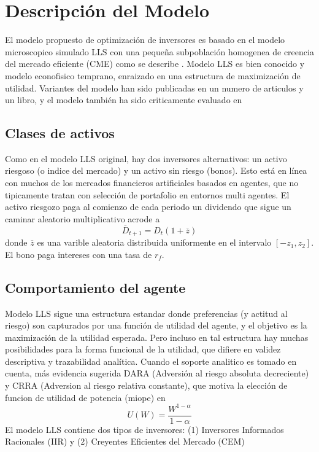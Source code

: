 \documentclass[12pt,a4paper]{article}
\begin{document}
\section*{Descripción del Modelo}
El modelo propuesto de optimización de inversores es basado en el modelo microscopico simulado LLS \citep{Levy2000} con una pequeña subpoblación homogenea de creencia del mercado eficiente (CME) como se describe \citep{levy2000}. Modelo LLS es bien conocido y modelo econofisico temprano, enraizado en una estructura de maximización de utilidad. Variantes del modelo han sido publicadas en un numero de articulos y un libro, y el modelo también ha sido criticamente evaluado en \citep{Zschischang2001}
\subsection*{Clases de activos}
Como en el modelo LLS original, hay dos inversores 
alternativos: un activo riesgoso (o indice del 
mercado) y un activo sin riesgo (bonos). Esto está 
en línea con muchos de los mercados financieros 
artificiales basados en agentes, que no
tipicamente tratan con selección de portafolio en entornos multi agentes. El activo riesgozo paga al comienzo de cada periodo un dividendo que sigue un caminar aleatorio multiplicativo acrode a 
\begin{equation}
\overline{D}_{t+1}= D_{t}(1+\overline{z})\label{6.1}
\end{equation}
donde $\overline{z}$ es una varible aleatoria distribuida uniformente en el intervalo $[-z_1,z_2]$. El bono paga intereses con una tasa de $r_f$.
\subsection*{Comportamiento del agente}
Modelo LLS sigue una estructura estandar donde preferencias (y actitud al riesgo) son capturados por una función de utilidad del agente, y el objetivo es la maximización de la utilidad esperada. Pero incluso en tal estructura hay muchas posibilidades para la forma funcional de la utilidad, que difiere en validez descriptiva y trazabilidad analítica. Cuando el soporte analitico es tomado en cuenta, más evidencia sugerida DARA (Adversión al riesgo absoluta decreciente) y CRRA (Adversion al riesgo relativa constante), que motiva la elección de funcion de utilidad de potencia (miope) en \citep{levy2000}
\begin{equation}
U(W)=\frac{W^{1-\alpha}}{1-\alpha} \label{6.2}
\end{equation}  
El modelo LLS contiene dos tipos de inversores: (1) Inversores Informados Racionales (IIR) y (2) Creyentes Eficientes del Mercado (CEM)
\end{document}
